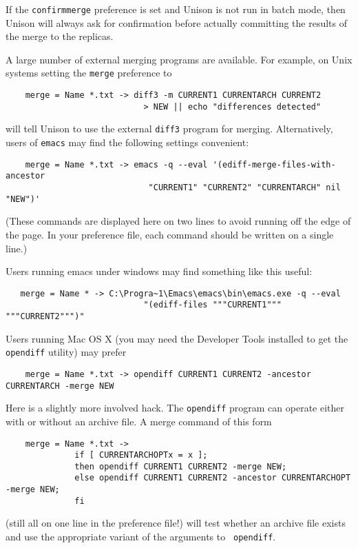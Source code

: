 \documentclass{article}
\begin{document}
If the \verb|confirmmerge| preference is set and Unison is not run in
batch mode, then Unison will always ask for confirmation before
actually committing the results of the merge to the replicas.

A large number of external merging programs are available.
For example, on Unix systems setting the \verb|merge| preference to
\begin{verbatim}
    merge = Name *.txt -> diff3 -m CURRENT1 CURRENTARCH CURRENT2
                            > NEW || echo "differences detected"
\end{verbatim}
\noindent
will tell Unison to use the external \verb|diff3| program for merging.
%
Alternatively, users of \verb|emacs| may find the following settings convenient:
\begin{verbatim}
    merge = Name *.txt -> emacs -q --eval '(ediff-merge-files-with-ancestor
                             "CURRENT1" "CURRENT2" "CURRENTARCH" nil "NEW")'
\end{verbatim}
\noindent
(These commands are displayed here on two lines to avoid running off the
edge of the page.  In your preference file, each command should be written on a
single line.)

Users running emacs under windows may find something like this useful:
\begin{verbatim}
   merge = Name * -> C:\Progra~1\Emacs\emacs\bin\emacs.exe -q --eval
                            "(ediff-files """CURRENT1""" """CURRENT2""")"
\end{verbatim}

Users running Mac OS X (you may need the Developer Tools installed to get
the {\tt opendiff} utility) may prefer
\begin{verbatim}
    merge = Name *.txt -> opendiff CURRENT1 CURRENT2 -ancestor CURRENTARCH -merge NEW
\end{verbatim}
Here is a slightly more involved hack.  The {\tt opendiff} program can
operate either with or without an archive file.  A merge command of this
form
\begin{verbatim}
    merge = Name *.txt ->
              if [ CURRENTARCHOPTx = x ];
              then opendiff CURRENT1 CURRENT2 -merge NEW;
              else opendiff CURRENT1 CURRENT2 -ancestor CURRENTARCHOPT -merge NEW;
              fi
\end{verbatim}
(still all on one line in the preference file!) will test whether an archive
file exists and use the appropriate variant of the arguments to {\tt
  opendiff}.
\end{document}
